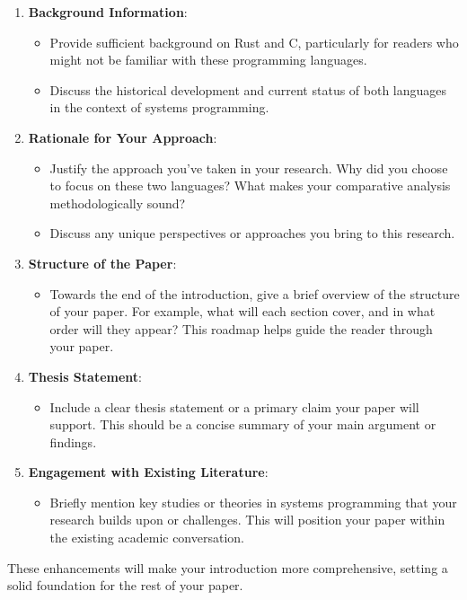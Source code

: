 \documentclass[conference]{IEEEtran}
\begin{document}
{\begin{enumerate}
      \item \textbf{Background Information}:
            \begin{itemize}
                \item Provide sufficient background on Rust and C, particularly for readers who might not be familiar with these programming languages.
                \item Discuss the historical development and current status of both languages in the context of systems programming.
            \end{itemize}

      \item \textbf{Rationale for Your Approach}:
            \begin{itemize}
                \item Justify the approach you've taken in your research. Why did you choose to focus on these two languages? What makes your comparative analysis methodologically sound?
                \item Discuss any unique perspectives or approaches you bring to this research.
            \end{itemize}

      \item \textbf{Structure of the Paper}:
            \begin{itemize}
                \item Towards the end of the introduction, give a brief overview of the structure of your paper. For example, what will each section cover, and in what order will they appear? This roadmap helps guide the reader through your paper.
            \end{itemize}

      \item \textbf{Thesis Statement}:
            \begin{itemize}
                \item Include a clear thesis statement or a primary claim your paper will support. This should be a concise summary of your main argument or findings.
            \end{itemize}

      \item \textbf{Engagement with Existing Literature}:
            \begin{itemize}
                \item Briefly mention key studies or theories in systems programming that your research builds upon or challenges. This will position your paper within the existing academic conversation.
            \end{itemize}
  \end{enumerate}

  These enhancements will make your introduction more comprehensive, setting a solid foundation for the rest of your paper.}
\end{document}
